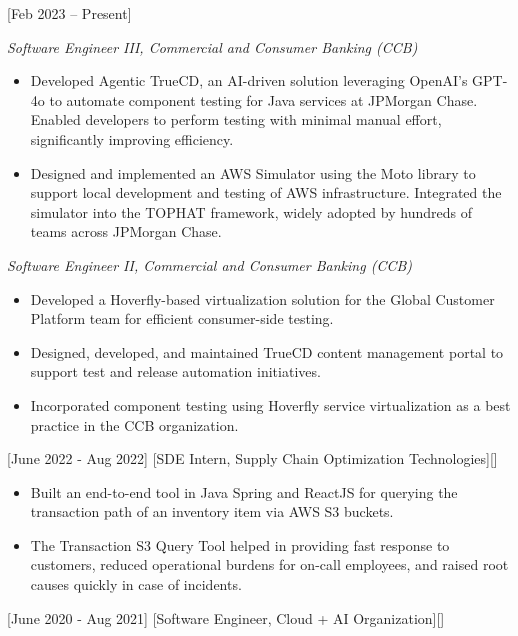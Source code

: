 \documentclass{article}
\begin{document}
[Feb 2023 -- Present]

\textit{Software Engineer III, Commercial and Consumer Banking (CCB)} \hfill 
\vspace{-2mm}
\begin{itemize}[leftmargin=*]
  \item Developed Agentic TrueCD, an AI-driven solution leveraging OpenAI’s GPT-4o to automate component testing for Java services at JPMorgan Chase. Enabled developers to perform testing with minimal manual effort, significantly improving efficiency.
  \item Designed and implemented an AWS Simulator using the Moto library to support local development and testing of AWS infrastructure. Integrated the simulator into the TOPHAT framework, widely adopted by hundreds of teams across JPMorgan Chase.
\end{itemize}

\vspace{-1mm}
\textit{Software Engineer II, Commercial and Consumer Banking (CCB)}
\vspace{-2mm}
\begin{itemize}[leftmargin=*]
  \item Developed a Hoverfly-based virtualization solution for the Global Customer Platform team for efficient consumer-side testing.
  \item Designed, developed, and maintained TrueCD content management portal to support test and release automation initiatives.
  \item Incorporated component testing using Hoverfly service virtualization as a best practice in the CCB organization.
\end{itemize}

[June 2022 - Aug 2022]
[SDE Intern, Supply Chain Optimization Technologies][]

\begin{itemize}
\item Built an end-to-end tool in Java Spring and ReactJS for querying the transaction path of an inventory item via AWS S3 buckets.
\item The Transaction S3 Query Tool helped in providing fast response to customers, reduced operational burdens for on-call employees, and raised root causes quickly in case of incidents.

\end{itemize}

[June 2020 - Aug 2021]
[Software Engineer, Cloud + AI Organization][]
\end{document}
